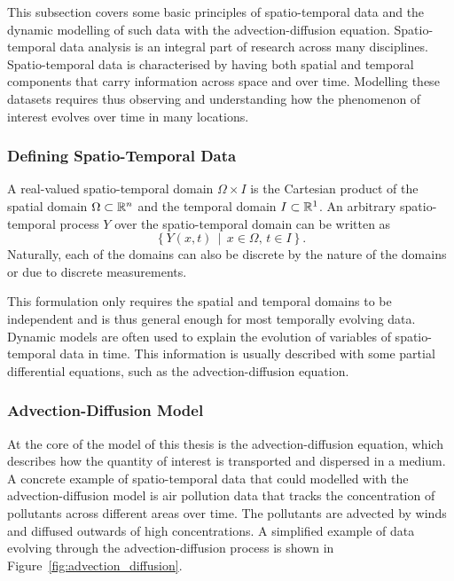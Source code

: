 This subsection covers some basic principles of spatio-temporal data and the dynamic modelling of such data with the advection-diffusion equation. 
Spatio-temporal data analysis is an integral part of research across many disciplines.
Spatio-temporal data is characterised by having both spatial and temporal components that carry information across space and over time.
Modelling these datasets requires thus observing and understanding how the phenomenon of interest evolves over time in many locations.

\subsubsection{Defining Spatio-Temporal Data}
A real-valued spatio-temporal domain $\Omega \times I$ is the Cartesian product of the spatial domain $\Omega \subset \mathbb{R}^n$ and the temporal domain $I \subset \mathbb{R}^1$.
An arbitrary spatio-temporal process $Y$ over the spatio-temporal domain can be written as
\begin{equation*}
    \left\{ Y(x, t) \, \middle\vert \, x \in \Omega, \, t \in I \right\}.
\end{equation*}
Naturally, each of the domains can also be discrete by the nature of the domains or due to discrete measurements.

This formulation only requires the spatial and temporal domains to be independent and is thus general enough for most temporally evolving data. 
Dynamic models are often used to explain the evolution of variables of spatio-temporal data in time.
This information is usually described with some partial differential equations, such as the advection-diffusion equation.

\subsubsection{Advection-Diffusion Model}\label{subsubsection:dynamicmodellingspatiotemporaldata}
At the core of the model of this thesis is the advection-diffusion equation, which describes how the quantity of interest is transported and dispersed in a medium.
A concrete example of spatio-temporal data that could modelled with the advection-diffusion model is air pollution data that tracks the concentration of pollutants across different areas over time.
The pollutants are advected by winds and diffused outwards of high concentrations.
A simplified example of data evolving through the advection-diffusion process is shown in Figure~\ref{fig:advection_diffusion}.

